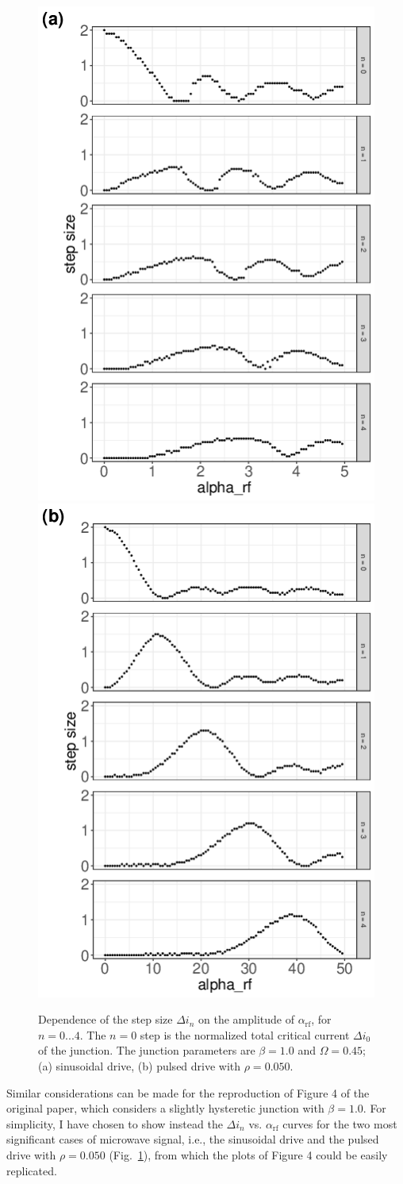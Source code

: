 \begin{figure}[t]
	\centering
	\includegraphics[width = 0.45 \textwidth]{images/SINGLE-BETA1.png}
	\includegraphics[width = 0.45 \textwidth]{images/PULS0050-BETA1.png}
	\caption{Dependence of the step size $\Delta i_n$ on the amplitude of  $\alpha_\mathrm{rf}$, for $n = 0. . . 4$. The $n = 0$ step is the normalized total critical current $\Delta i_0$ of the junction. The junction parameters are $\beta = 1.0$ and $\Omega = 0. 45$; (a) sinusoidal drive, (b) pulsed drive with $\rho = 0. 050$.}
	\label{fig:step-width-beta1}
\end{figure}


Similar considerations can be made for the reproduction of Figure 4 of the original paper, which considers a slightly hysteretic junction with $\beta = 1.0$. For simplicity, I have chosen to show instead the $\Delta i_n$ vs. $\alpha_\mathrm{rf}$ curves for the two most significant cases of microwave signal, i.e., the sinusoidal drive and the pulsed drive with $\rho = 0.050$ (Fig.~\ref{fig:step-width-beta1}), from which the plots of Figure 4 could be easily replicated.


